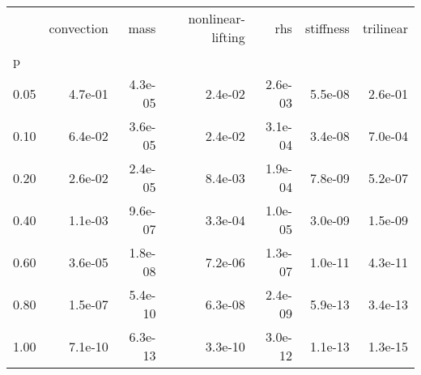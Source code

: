 \begin{tabular}{lrrrrrr}
\toprule
{} &  convection &    mass &  nonlinear-lifting &     rhs &  stiffness &  trilinear \\
p    &             &         &                    &         &            &            \\
\midrule
0.05 &     4.7e-01 & 4.3e-05 &            2.4e-02 & 2.6e-03 &    5.5e-08 &    2.6e-01 \\
0.10 &     6.4e-02 & 3.6e-05 &            2.4e-02 & 3.1e-04 &    3.4e-08 &    7.0e-04 \\
0.20 &     2.6e-02 & 2.4e-05 &            8.4e-03 & 1.9e-04 &    7.8e-09 &    5.2e-07 \\
0.40 &     1.1e-03 & 9.6e-07 &            3.3e-04 & 1.0e-05 &    3.0e-09 &    1.5e-09 \\
0.60 &     3.6e-05 & 1.8e-08 &            7.2e-06 & 1.3e-07 &    1.0e-11 &    4.3e-11 \\
0.80 &     1.5e-07 & 5.4e-10 &            6.3e-08 & 2.4e-09 &    5.9e-13 &    3.4e-13 \\
1.00 &     7.1e-10 & 6.3e-13 &            3.3e-10 & 3.0e-12 &    1.1e-13 &    1.3e-15 \\
\bottomrule
\end{tabular}
